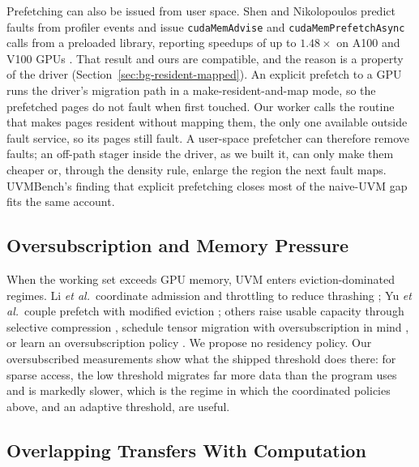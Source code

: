 Prefetching can also be issued from user space. Shen and Nikolopoulos predict
faults from profiler events and issue \texttt{cudaMemAdvise} and
\texttt{cudaMemPrefetchAsync} calls from a preloaded library, reporting speedups
of up to $1.48\times$ on A100 and V100 GPUs \cite{shen2026stride}. That result
and ours are compatible, and the reason is a property of the driver
(Section~\ref{sec:bg-resident-mapped}). An explicit prefetch to a GPU runs the
driver's migration path in a make-resident-and-map mode, so the prefetched pages
do not fault when first touched. Our worker calls the routine that makes pages
resident without mapping them, the only one available outside fault service, so
its pages still fault. A user-space prefetcher can therefore remove faults; an
off-path stager inside the driver, as we built it, can only make them cheaper
or, through the density rule, enlarge the region the next fault maps.
UVMBench's finding that explicit prefetching closes most of the naive-UVM gap
\cite{gu2020uvmbench} fits the same account.

\subsection{Oversubscription and Memory Pressure}

When the working set exceeds GPU memory, UVM enters eviction-dominated regimes.
Li \emph{et al.}\ coordinate admission and throttling to reduce thrashing
\cite{li2019oversubframework}; Yu \emph{et al.}\ couple prefetch with modified
eviction \cite{yu2020cppe}; others raise usable capacity through selective
compression \cite{nihaal2024compression}, schedule tensor migration with
oversubscription in mind \cite{kim2025most}, or learn an oversubscription
policy \cite{long2022oversub}. We propose no residency policy. Our
oversubscribed measurements show what the shipped threshold does there: for
sparse access, the low threshold migrates far more data than the program uses
and is markedly slower, which is the regime in which the coordinated policies
above, and an adaptive threshold, are useful.

\subsection{Overlapping Transfers With Computation}

